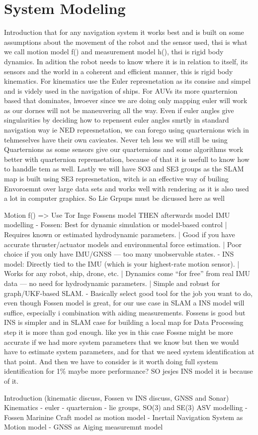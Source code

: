\section{System Modeling}

Introduction that for any navigation system it works best and is built on some assumptions about the movement of the robot and the sensor used, thsi is what we call motion model f() and measurement model h(), thsi is rigid body dynamics. In adition the robot needs to know where it is in relation to itself, its sensors and the world in a coherent and efficient manner, this is rigid body kinematics.
For kinematics use the Euler represnetation as its consise and simpel and is videly used in the navigation of ships. For AUVs its more quarternion based that dominates, hwoever since we are doing only mapping euler will work as our dornes will not be maneuvering all the way. 
Even if euler angles give singularities by deciding how to repensent euler angles smrtly in standard navigation way ie NED represnetation, we can forego using quarternions wich in tehmeselves have their own cavieates. 
Never teh less we will still be using Quarternions as some sensors give our quarternions and some algorithms work better with quarternion reprensetation, because of that it is usefull to know how to handdle tem as well.
Lastly we will have SO3 and SE3 groups as the SLAM map is built using SE3 represnetation, witch is an effective way of builing Envoroemnt over large data sets and works well with rendering as it is also used a lot in computer graphics. So Lie Grpups must be dicussed here as well 

Motion f() => Use Tor Inge Fossens model THEN afterwards model IMU modelling
   - Fossen: Best for dynamic simulation or model-based control | Requires known or estimated hydrodynamic parameters. | Good if you have accurate thruster/actuator models and environmental force estimation. | Poor choice if you only have IMU/GNSS — too many unobservable states.
   - INS model: Directly tied to the IMU (which is your highest-rate motion sensor). | Works for any robot, ship, drone, etc. | Dynamics come “for free” from real IMU data — no need for hydrodynamic parameters. | Simple and robust for graph/UKF-based SLAM.
   - Basically select good tool for the job you want to do, even though Fossen model is great, for our use case in SLAM a INS model will suffice, especially i combination with aiding measurements. Fossens is good but INS is simpler and in SLAM case for building a local map for Data Processing step it is more than god enough. like yes in this case Fossne might be more accurate if we had more system parameters that we know but then we would have to estimate system parameters, and for that we need system identification at that point. And then we have to consider is it worth doing full system identification for 1\% maybe more performance? SO jesjes INS model it is because of it.



Introduction (kinematic discuss, Fossen vs INS discuss, GNSS and Sonar)
Kinematics 
- euler
- quarternion
- lie groups, SO(3) and SE(3)
ASV modelling
- Fossen Marinine Craft model as motion model
- Inertail Navigation System as Motion model
- GNSS as Aiging measuremnt model

